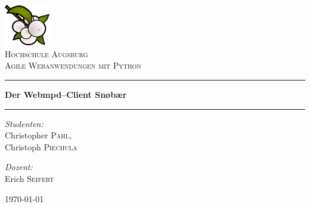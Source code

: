 \begin{titlepage}
\begin{center}

\includegraphics[width=0.15\textwidth]{docs/pics/logo.png}~\\[1cm]
\textsc{\LARGE Hochschule Augsburg}\\[1.5cm]
\textsc{\Large Agile Webanwendungen mit Python}\\[0.5cm]

\rule{\linewidth}{0.5mm}
{ \huge \bfseries Der Webmpd--Client Snøbær\\[0.4cm] }
\rule{\linewidth}{0.5mm}

\noindent
\begin{minipage}[t]{0.4\textwidth}
\begin{flushleft} \large
\emph{Studenten:}\\
Christopher \textsc{Pahl},\\Christoph \textsc{Piechula}
\end{flushleft}
\end{minipage}%
\begin{minipage}[t]{0.4\textwidth}
\begin{flushright} \large
\emph{Dozent:} \\
Erich \textsc{Seifert}
\end{flushright}
\end{minipage}

\vfill

{\large \today}
\end{center}
\end{titlepage}
